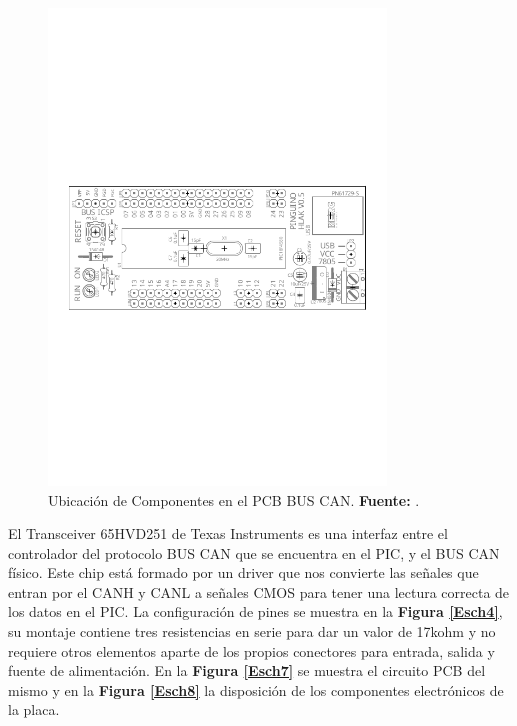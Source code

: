 \begin{figure}[H]
	\centering
		\includegraphics[trim = 5mm 53mm 5mm 50mm, clip, width=0.8\textwidth]{./Cap4imagen/CanGraf2.pdf}
	\caption[ Ubicación de Componentes en el PCB BUS CAN.]{Ubicación de Componentes en el PCB BUS CAN.\textbf{ Fuente:} \cite{Tu}.}
	\label{Esch6} %
\end{figure}




El Transceiver 65HVD251 de Texas Instruments es una interfaz entre el controlador del protocolo BUS CAN que se encuentra en el PIC, y el BUS CAN físico. Este chip está formado por un driver que nos convierte las señales que entran por el CANH  y CANL a señales CMOS para tener una lectura correcta de los datos en el PIC. La configuración de pines se muestra en la \textbf{Figura \ref{Esch4}}, su montaje contiene tres resistencias en serie para dar un valor de 17kohm y no requiere otros elementos aparte de los propios conectores para  entrada, salida y fuente de alimentación.
En la \textbf{Figura \ref{Esch7}} se muestra el circuito PCB del mismo y en la \textbf{Figura \ref{Esch8}} la disposición de los componentes electrónicos de la placa.

